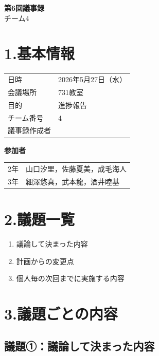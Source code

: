 \documentclass[a4paper,12pt]{ltjsarticle}
\begin{document}
\begin{center}
  {\Large \textbf{第6回議事録}}\\[8pt]
  {\large チーム4}
\end{center}

\vspace{4mm}

\section*{1.基本情報}
\begin{tabular}{ll}
  \toprule
  日時     & 2026年5月27日（水） \\
  会議場所 & 731教室 \\
  目的     & 進捗報告 \\
  チーム番号 & 4 \\
  議事録作成者 &  \\
  \bottomrule
\end{tabular}

\vspace{4mm}
\noindent\textbf{参加者}

\begin{tabular}{ll}
  2年 & 山口汐里，佐藤夏美，成毛海人 \\
  3年 & 細澤悠真，武本龍，酒井睦基 \\
\end{tabular}

\section*{2.議題一覧}
\begin{enumerate}[label=議題\arabic*：]
  \item 議論して決まった内容
  \item 計画からの変更点
  \item 個人毎の次回までに実施する内容
\end{enumerate}

\section*{3.議題ごとの内容}

\subsection*{議題①：議論して決まった内容}
\end{document}
